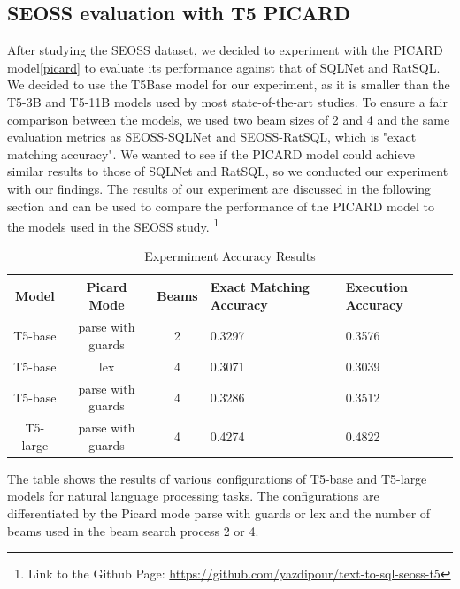 \subsection{SEOSS evaluation with T5 PICARD}

After studying the SEOSS dataset, we decided to experiment with the PICARD model\ref{picard} to evaluate its performance against that of SQLNet and RatSQL. We decided to use the T5Base model for our experiment, as it is smaller than the T5-3B and T5-11B models used by most state-of-the-art studies. To ensure a fair comparison between the models, we used two beam sizes of 2 and 4 and the same evaluation metrics as SEOSS-SQLNet and SEOSS-RatSQL, which is "exact matching accuracy". We wanted to see if the PICARD model could achieve similar results to those of SQLNet and RatSQL, so we conducted our experiment with our findings. The results of our experiment are discussed in the following section and can be used to compare the performance of the PICARD model to the models used in the SEOSS study.
\footnote[1]{Link to the Github Page: \url{https://github.com/yazdipour/text-to-sql-seoss-t5}}

\begin{table}[!ht]
    \centering
    \begin{tabular}{|c|c|c|L|L|}
        \hline
        Model    & Picard Mode       & Beams & \textbf{Exact Matching Accuracy} & \textbf{Execution Accuracy} \\ \hline
        T5-base  & parse with guards & 2     & 0.3297                           & 0.3576                      \\ \hline
        T5-base  & lex               & 4     & 0.3071                           & 0.3039                      \\ \hline
        T5-base  & parse with guards & 4     & 0.3286                           & 0.3512                      \\ \hline
        T5-large & parse with guards & 4     & 0.4274                           & 0.4822                      \\ \hline
    \end{tabular}
    \caption{Expermiment Accuracy Results}
\end{table}

The table shows the results of various configurations of T5-base and T5-large models for natural language processing tasks. The configurations are differentiated by the Picard mode parse with guards or lex and the number of beams used in the beam search process 2 or 4.

